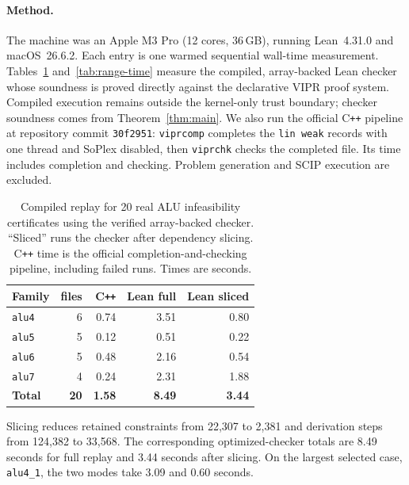 \documentclass[runningheads]{llncs}
\newcommand{\code}[1]{\texttt{#1}}
\newcommand{\scip}{\textsc{SCIP}}
\begin{document}
\paragraph{Method.} The machine was an Apple M3 Pro (12 cores, 36\,GB), running
Lean~4.31.0 and macOS~26.6.2. Each entry is one warmed sequential wall-time measurement.
Tables~\ref{tab:infeas-time} and~\ref{tab:range-time} measure the compiled,
array-backed Lean checker whose soundness is proved directly against the declarative
VIPR proof system.
Compiled execution remains outside the kernel-only trust boundary; checker soundness
comes from Theorem~\ref{thm:main}. We also run the official C\texttt{++}
pipeline at repository commit \code{30f2951}: \code{viprcomp} completes the
\code{lin weak} records with one thread and SoPlex disabled, then \code{viprchk} checks
the completed file. Its time includes completion and checking. Problem generation and
\scip{} execution are excluded.

\begin{table}[t]
\centering
\caption{Compiled replay for 20 real ALU infeasibility certificates using the verified
array-backed checker. ``Sliced'' runs the checker after dependency slicing.
C\texttt{++} time is the official
completion-and-checking pipeline, including failed runs. Times are seconds.}
\label{tab:infeas-time}
\small
\setlength{\tabcolsep}{9pt}
\begin{tabular}{lrrrr}
\toprule
Family & files & C\texttt{++} & Lean full & Lean sliced \\
\midrule
\code{alu4} & 6 & 0.74 & 3.51 & 0.80 \\
\code{alu5} & 5 & 0.12 & 0.51 & 0.22 \\
\code{alu6} & 5 & 0.48 & 2.16 & 0.54 \\
\code{alu7} & 4 & 0.24 & 2.31 & 1.88 \\
\midrule
\textbf{Total} & \textbf{20} & \textbf{1.58} & \textbf{8.49} &
  \textbf{3.44} \\
\bottomrule
\end{tabular}
\end{table}

Slicing reduces retained constraints from 22,307 to 2,381 and derivation steps from
124,382 to 33,568. The corresponding optimized-checker totals are 8.49 seconds for
full replay and 3.44 seconds after slicing. On the largest selected case,
\code{alu4\_1}, the two modes take 3.09 and 0.60 seconds.
\end{document}
